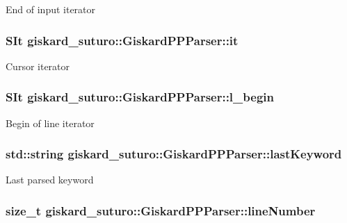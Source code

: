 End of input iterator \hypertarget{classgiskard__suturo_1_1GiskardPPParser_a7dee6cfbff88604796d7968fc190e810}{
\subsubsection[{it}]{\setlength{\rightskip}{0pt plus 5cm}S\-It giskard\-\_\-suturo\-::\-Giskard\-P\-P\-Parser\-::it\hspace{0.3cm}{\ttfamily [private]}}}\label{classgiskard__suturo_1_1GiskardPPParser_a7dee6cfbff88604796d7968fc190e810}
Cursor iterator \hypertarget{classgiskard__suturo_1_1GiskardPPParser_ab1fa470eaed886d6ff52f85fe8618c7f}{
\subsubsection[{l\-\_\-begin}]{\setlength{\rightskip}{0pt plus 5cm}S\-It giskard\-\_\-suturo\-::\-Giskard\-P\-P\-Parser\-::l\-\_\-begin\hspace{0.3cm}{\ttfamily [private]}}}\label{classgiskard__suturo_1_1GiskardPPParser_ab1fa470eaed886d6ff52f85fe8618c7f}
Begin of line iterator \hypertarget{classgiskard__suturo_1_1GiskardPPParser_ad6743dbba552509d2d55cdb874ac7e76}{
\subsubsection[{last\-Keyword}]{\setlength{\rightskip}{0pt plus 5cm}std\-::string giskard\-\_\-suturo\-::\-Giskard\-P\-P\-Parser\-::last\-Keyword\hspace{0.3cm}{\ttfamily [private]}}}\label{classgiskard__suturo_1_1GiskardPPParser_ad6743dbba552509d2d55cdb874ac7e76}
Last parsed keyword \hypertarget{classgiskard__suturo_1_1GiskardPPParser_ae4a702a812d943e99e67ffa7da455ec9}{
\subsubsection[{line\-Number}]{\setlength{\rightskip}{0pt plus 5cm}size\-\_\-t giskard\-\_\-suturo\-::\-Giskard\-P\-P\-Parser\-::line\-Number\hspace{0.3cm}{\ttfamily [private]}}}\label{classgiskard__suturo_1_1GiskardPPParser_ae4a702a812d943e99e67ffa7da455ec9}

